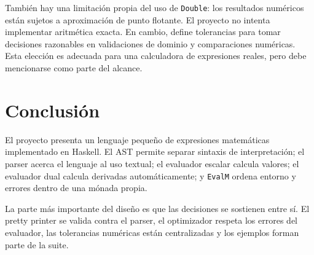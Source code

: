 \documentclass[11pt,a4paper]{article}
\begin{document}
También hay una limitación propia del uso de \texttt{Double}: los resultados numéricos están sujetos a aproximación de punto flotante. El proyecto no intenta implementar aritmética exacta. En cambio, define tolerancias para tomar decisiones razonables en validaciones de dominio y comparaciones numéricas. Esta elección es adecuada para una calculadora de expresiones reales, pero debe mencionarse como parte del alcance.

\section{Conclusión}

El proyecto presenta un lenguaje pequeño de expresiones matemáticas implementado en Haskell. El AST permite separar sintaxis de interpretación; el parser acerca el lenguaje al uso textual; el evaluador escalar calcula valores; el evaluador dual calcula derivadas automáticamente; y \texttt{EvalM} ordena entorno y errores dentro de una mónada propia.

La parte más importante del diseño es que las decisiones se sostienen entre sí. El pretty printer se valida contra el parser, el optimizador respeta los errores del evaluador, las tolerancias numéricas están centralizadas y los ejemplos forman parte de la suite.
\end{document}
